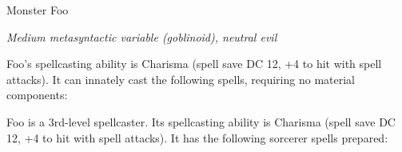 \documentclass[letterpaper,twocolumn,openany]{dndbook}
\begin{document}
\begin{monsterbox}{Monster Foo}
  \begin{hangingpar}
    \textit{Medium metasyntactic variable (goblinoid), neutral evil}
  \end{hangingpar}

  \dndline%

  \basics[%
  armorclass = 9 (12 with \emph{mage armor}),
  hitpoints  = \dice{3d8+3},
  speed      = {30 ft., fly 30 ft.},
  ]

  \dndline%

  \stats[
    STR = \stat{12}, %
    DEX = \stat{8},
    CON = \stat{13},
    INT = \stat{10},
    WIS = \stat{14},
    CHA = \stat{15},
  ]

  \dndline%

  \details[%
    senses = {darkvision 60 ft., passive Perception 10},
    languages = {Common, Goblin},
    challenge = {1},
  ]

  \dndline%


  \begin{monsteraction}
    Foo's spellcasting ability is Charisma (spell save DC 12, +4 to hit with spell attacks). It can innately cast the following spells, requiring no material components:
    \medskip
  \end{monsteraction}

  \begin{monsteraction}[Spellcasting]
    Foo is a 3rd-level spellcaster. Its spellcasting ability is Charisma (spell save DC 12, +4 to hit with spell attacks). It has the following sorcerer spells prepared:
    \medskip
  \end{monsteraction}


\end{monsterbox}
\end{document}
